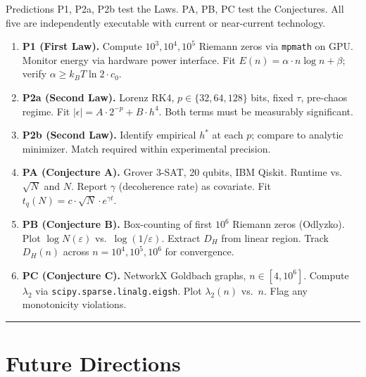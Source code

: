 \documentclass[12pt]{article}
\theoremstyle{lawstyle}
\theoremstyle{conjstyle}
\theoremstyle{predstyle}
\begin{document}
Predictions P1, P2a, P2b test the Laws. PA, PB, PC test the Conjectures. All five are
independently executable with current or near-current technology.

\begin{enumerate}[label=\textbf{(\arabic*)}, leftmargin=*, itemsep=6pt]

  \item \textbf{P1 (First Law).} Compute $10^3, 10^4, 10^5$ Riemann zeros via
    \texttt{mpmath} on GPU. Monitor energy via hardware power interface. Fit
    $E(n) = \alpha \cdot n \log n + \beta$; verify $\alpha \geq k_B T \ln 2 \cdot c_0$.

  \item \textbf{P2a (Second Law).} Lorenz RK4, $p \in \{32, 64, 128\}$ bits, fixed $\tau$,
    pre-chaos regime. Fit $|\epsilon| = A \cdot 2^{-p} + B \cdot h^4$. Both terms must be
    measurably significant.

  \item \textbf{P2b (Second Law).} Identify empirical $h^*$ at each $p$; compare to analytic
    minimizer. Match required within experimental precision.

  \item \textbf{PA (Conjecture A).} Grover 3-SAT, 20 qubits, IBM Qiskit. Runtime vs.\
    $\sqrt{N}$ and $N$. Report $\gamma$ (decoherence rate) as covariate.
    Fit $t_q(N) = c \cdot \sqrt{N} \cdot e^{\gamma t}$.

  \item \textbf{PB (Conjecture B).} Box-counting of first $10^6$ Riemann zeros (Odlyzko).
    Plot $\log N(\varepsilon)$ vs.\ $\log(1/\varepsilon)$. Extract $D_H$ from linear region.
    Track $D_H(n)$ across $n = 10^4, 10^5, 10^6$ for convergence.

  \item \textbf{PC (Conjecture C).} NetworkX Goldbach graphs, $n \in [4, 10^6]$. Compute
    $\lambda_2$ via \texttt{scipy.sparse.linalg.eigsh}. Plot $\lambda_2(n)$ vs.\ $n$.
    Flag any monotonicity violations.

\end{enumerate}

\bigskip
\hrule
\bigskip

\section{Future Directions}
\end{document}
